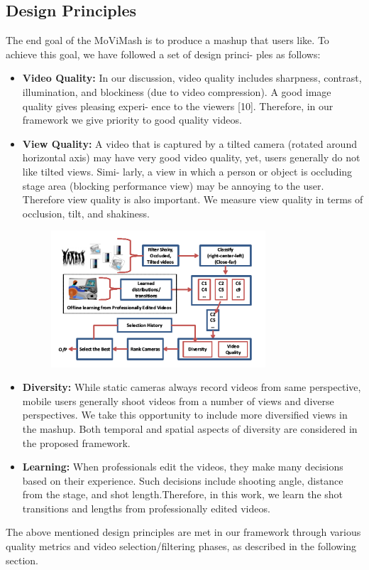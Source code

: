 \documentclass{sig-alternate}
\begin{document}
\subsection{Design Principles}
\par The end goal of the MoViMash is to produce a mashup that users
like. To achieve this goal, we have followed a set of design princi-
ples as follows:
\begin{itemize}
    \item \textbf{Video Quality:} In our discussion, video quality includes
sharpness, contrast, illumination, and blockiness (due to video
compression). A good image quality gives pleasing experi-
ence to the viewers [10]. Therefore, in our framework we
give priority to good quality videos.
    \item \textbf{View Quality:} A video that is captured by a tilted camera
(rotated around horizontal axis) may have very good video
quality, yet, users generally do not like tilted views. Simi-
larly, a view in which a person or object is occluding stage
area (blocking performance view) may be annoying to the user. Therefore view quality is also important. We measure
view quality in terms of occlusion, tilt, and shakiness.

\begin{figure}
\centering
\includegraphics[width=8cm]{third.png}
\end{figure}

\item \textbf{Diversity:} While static cameras always record videos from
same perspective, mobile users generally shoot videos from
a number of views and diverse perspectives. We take this
opportunity to include more diversified views in the mashup.
Both temporal and spatial aspects of diversity are considered
in the proposed framework.
\item \textbf{Learning:} When professionals edit the videos, they make
many decisions based on their experience. Such decisions
include shooting angle, distance from the stage, and shot
length.Therefore, in this work,
we learn the shot transitions and lengths from professionally
edited videos.
\end{itemize}
\par The above mentioned design principles are met in our framework
through various quality metrics and video selection/filtering phases,
as described in the following section.
\end{document}
